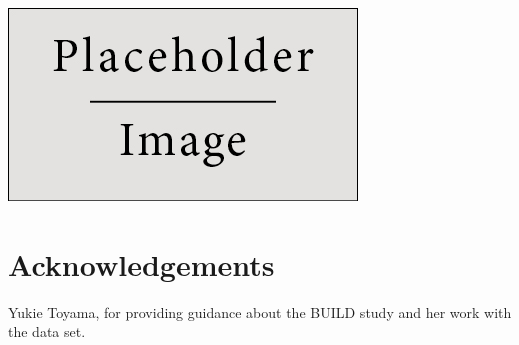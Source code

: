 \documentclass[a0,landscape]{a0poster}
\begin{document}
\begin{multicols}{3}
\begin{center}\vspace{1cm}
\includegraphics[width=0.8\linewidth]{placeholder}
\end{center}\vspace{1cm}


\section*{Acknowledgements}

Yukie Toyama, for providing guidance about the BUILD study and her work with the data set.


\end{multicols}
\end{document}
